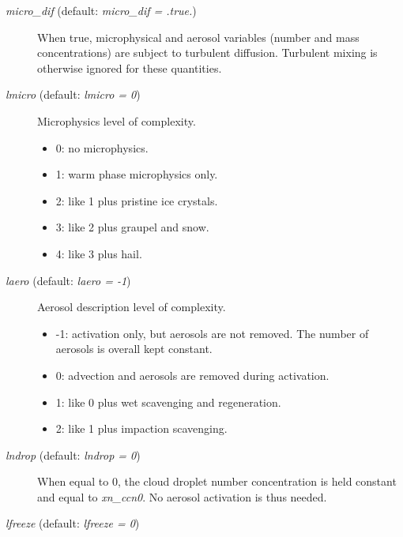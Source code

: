 \documentclass[12pt,A4,french]{article}
\begin{document}
\begin{description}

\item[{\it micro\_dif} (default: {\it micro\_dif = .true.})]

When true, microphysical and aerosol variables (number and mass concentrations) are subject to turbulent diffusion. Turbulent mixing is otherwise ignored for these quantities.

\item[{\it lmicro} (default: {\it lmicro = 0})]

Microphysics level of complexity.
\begin{itemize}
    \item 0: no microphysics.\\
    \item 1: warm phase microphysics only.\\
    \item 2: like 1 plus pristine ice crystals.\\
    \item 3: like 2 plus graupel and snow.\\
    \item 4: like 3 plus hail.
\end{itemize}

\item[{\it laero} (default: {\it laero = -1})]

Aerosol description level of complexity.
\begin{itemize}
    \item -1: activation only, but aerosols are not removed. The number of aerosols is overall kept constant.\\
    \item 0: advection and aerosols are removed during activation.\\
    \item 1: like 0 plus wet scavenging and regeneration.\\
    \item 2: like 1 plus impaction scavenging.\\
\end{itemize}

\item[{\it lndrop} (default: {\it lndrop = 0})]

When equal to 0, the cloud droplet number concentration is held constant and equal to {\it xn\_ccn0}. No aerosol activation is thus needed.

\item[{\it lfreeze} (default: {\it lfreeze = 0})]


\end{description}
\end{document}
